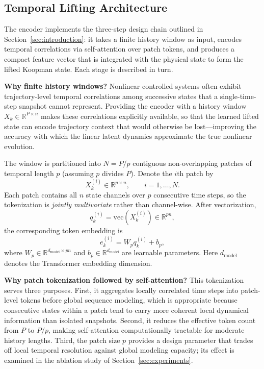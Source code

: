 \documentclass[journal]{IEEEtran}
\begin{document}
\subsection{Temporal Lifting Architecture}
\label{sec:temporal_lifting}

The encoder implements the three-step design chain outlined in Section~\ref{sec:introduction}: it takes a finite history window as input, encodes temporal correlations via self-attention over patch tokens, and produces a compact feature vector that is integrated with the physical state to form the lifted Koopman state. Each stage is described in turn.

\textbf{Why finite history windows?} Nonlinear controlled systems often exhibit trajectory-level temporal correlations among successive states that a single-time-step snapshot cannot represent. Providing the encoder with a history window $X_k \in \mathbb{R}^{P\times n}$ makes these correlations explicitly available, so that the learned lifted state can encode trajectory context that would otherwise be lost---improving the accuracy with which the linear latent dynamics approximate the true nonlinear evolution.

The window is partitioned into $N=P/p$ contiguous non-overlapping patches of temporal length $p$ (assuming $p$ divides $P$). Denote the $i$th patch by
\begin{equation}
    X_k^{(i)} \in \mathbb{R}^{p\times n}, \qquad i=1,\ldots,N.
\end{equation}
Each patch contains all $n$ state channels over $p$ consecutive time steps, so the tokenization is \emph{jointly multivariate} rather than channel-wise. After vectorization,
\begin{equation}
    q_k^{(i)} = \mathrm{vec}(X_k^{(i)}) \in \mathbb{R}^{pn},
\end{equation}
the corresponding token embedding is
\begin{equation}
    e_k^{(i)} = W_p q_k^{(i)} + b_p,
    \label{eq:patch_embedding}
\end{equation}
where $W_p \in \mathbb{R}^{d_{\mathrm{model}}\times pn}$ and $b_p \in \mathbb{R}^{d_{\mathrm{model}}}$ are learnable parameters. Here $d_{\mathrm{model}}$ denotes the Transformer embedding dimension.

\textbf{Why patch tokenization followed by self-attention?}
This tokenization serves three purposes. First, it aggregates locally correlated time steps into patch-level tokens before global sequence modeling, which is appropriate because consecutive states within a patch tend to carry more coherent local dynamical information than isolated snapshots. Second, it reduces the effective token count from $P$ to $P/p$, making self-attention computationally tractable for moderate history lengths. Third, the patch size $p$ provides a design parameter that trades off local temporal resolution against global modeling capacity; its effect is examined in the ablation study of Section~\ref{sec:experiments}.
\end{document}
